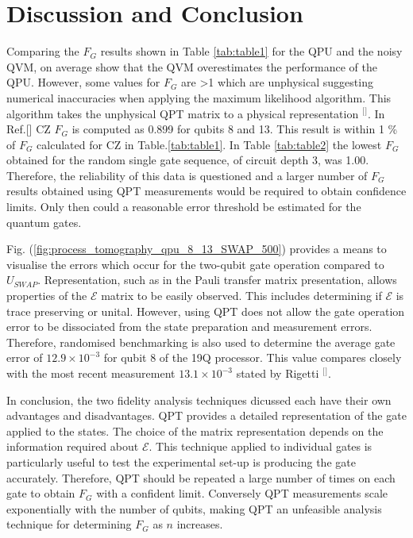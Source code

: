 \section{\label{sec:level1}Discussion and Conclusion} Comparing the $F_{G}$ results shown in Table \ref{tab:table1} for the QPU and the noisy QVM, on average show that the QVM overestimates the performance of the QPU. However, some values for $F_{G}$ are >1 which are unphysical suggesting numerical inaccuracies when applying the maximum likelihood algorithm. This algorithm takes the unphysical QPT matrix to a physical representation $^{[}$\citep{Chow2012UniversalQubits}$^{]}$. In Ref.[] CZ $F_{G}$ is computed as 0.899 for qubits 8 and 13. This result is within 1 \% of $F_{G}$ calculated for CZ in Table.\ref{tab:table1}. In Table \ref{tab:table2} the lowest $F_{G}$ obtained for the random single gate sequence, of circuit depth 3, was 1.00. Therefore, the reliability of this data is questioned and a larger number of $F_{G}$ results obtained using QPT measurements would be required to obtain confidence limits. Only then could a reasonable error threshold be estimated for the quantum gates.  
 

Fig. (\ref{fig:process_tomography_qpu_8_13_SWAP_500}) provides a means to visualise the errors which occur for the two-qubit gate operation compared to $U_{SWAP}$. Representation, such as in the Pauli transfer matrix presentation, allows properties of the $\mathcal{E}$ matrix to be easily observed. This includes determining if $\mathcal{E}$ is trace preserving or unital. However, using QPT does not allow the gate operation error to be dissociated from the state preparation and measurement errors. Therefore, randomised benchmarking is also used to determine the average gate error of $12.9 \times 10^{-3}$ for qubit 8 of the 19Q processor. This value compares closely with the most recent measurement $13.1 \times 10^{-3}$ stated by Rigetti $^{[}$\citep{RigettiPyQuilDocumentation}$^{]}$.


In conclusion, the two fidelity analysis techniques dicussed each have their own advantages and disadvantages. QPT provides a detailed representation of the gate applied to the states. The choice of the matrix representation depends on the information required about $\mathcal{E}$. This technique applied to individual gates is particularly useful to test the experimental set-up is producing the gate accurately. Therefore, QPT should be repeated a large number of times on each gate to obtain $F_{G}$ with a confident limit. Conversely QPT measurements scale exponentially with the number of qubits, making QPT an unfeasible analysis technique for determining $F_{G}$ as $n$ increases. 

